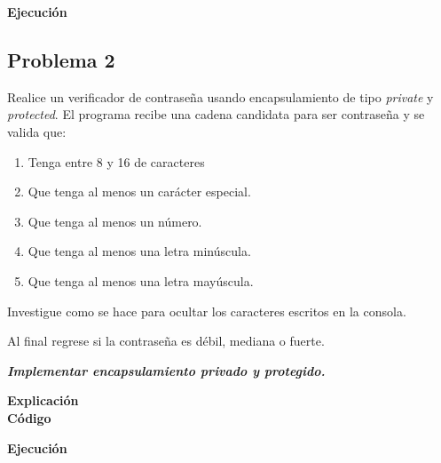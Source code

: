\documentclass[11pt, twocolumn]{article}
\newcommand{\linejump}{\hfill \break}
\begin{document}

  \textbf{Ejecución}

  \subsection*{Problema 2}
  Realice un verificador de contraseña usando encapsulamiento de tipo \textit{private} y \textit{protected}. El programa recibe una cadena candidata para ser contraseña y se valida que:
  \begin{enumerate}[label=\alph*.]
    \item Tenga entre 8 y 16 de caracteres
    \item Que tenga al menos un carácter especial.
    \item Que tenga al menos un número.
    \item Que tenga al menos una letra minúscula.
    \item Que tenga al menos una letra mayúscula.
  \end{enumerate}
  Investigue como se hace para ocultar los caracteres escritos en la consola.

  Al final regrese si la contraseña es débil, mediana o fuerte.

  \textbf{\textit{Implementar encapsulamiento privado y protegido.}}

  \linejump
  \textbf{Explicación} \\


  \textbf{Código}
    

  \textbf{Ejecución}
\end{document}
